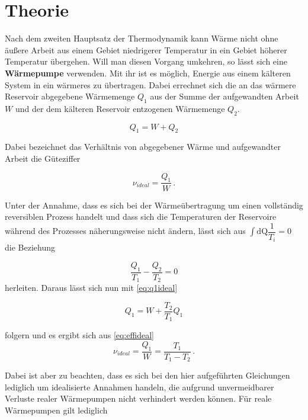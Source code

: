 \section{Theorie}
\label{sec:Theorie}
Nach dem zweiten Hauptsatz der Thermodynamik kann Wärme nicht ohne äußere Arbeit aus einem Gebiet niedrigerer Temperatur in ein Gebiet höherer Temperatur übergehen. Will man diesen Vorgang umkehren, so lässt sich
eine \textbf{Wärmepumpe} verwenden. Mit ihr ist es möglich, Energie aus einem kälteren System in ein wärmeres zu übertragen. Dabei errechnet sich die an das wärmere Reservoir abgegebene Wärmemenge $Q_1$ 
aus der Summe der aufgewandten Arbeit $W$ und der dem kälteren Reservoir entzogenen Wärmemenge $Q_2$.

\begin{equation}
    \label{eq:q1ideal}
    Q_1= W + Q_2
\end{equation}

Dabei bezeichnet das Verhältnis von abgegebener Wärme und aufgewandter Arbeit die Güteziffer

\begin{equation}
    \label{eq:effideal}
    ν_{ideal} = \dfrac{Q_1}{W} \, \text{.}
\end{equation}

Unter der Annahme, dass es sich bei der Wärmeübertragung um einen vollständig reversiblen Prozess handelt und dass sich die Temperaturen der Reservoire während des Prozesses näherungsweise nicht ändern, lässt sich aus
$\int{\mathrm{dQ}\dfrac{1}{T_i}}=0$ die Beziehung

\begin{equation}
    \label{eq:rever}
    \dfrac{Q_1}{T_1} - \dfrac{Q_2}{T_2} = 0
\end{equation}
herleiten.
Daraus lässt sich nun mit \eqref{eq:q1ideal}

\begin{equation}
    Q_1 = W +\dfrac{T_2}{T_1}Q_1
\end{equation}
    
folgern und es ergibt sich aus \eqref{eq:effideal}
\begin{equation}
    ν_{ideal} = \dfrac{Q_1}{W} = \dfrac{T_1}{T_1-T_2} \, \text{.} \label{eq:effTdiff}
\end{equation}

\newpage

Dabei ist aber zu beachten, dass es sich bei den hier aufgeführten Gleichungen lediglich um idealisierte Annahmen handeln, die aufgrund unvermeidbarer Verluste realer Wärmepumpen nicht verhindert werden können.
Für reale Wärmepumpen gilt lediglich

